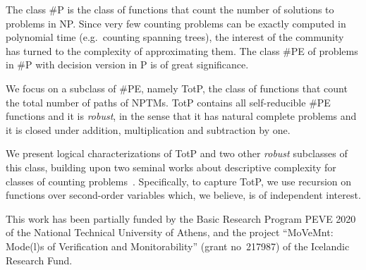 \documentclass[bsl,meeting]{asl}
\def\urladdr#1{\endgraf\noindent{\it URL Address}: {\tt #1}.}
\newcommand{\NP}{}
\begin{document}
\thispagestyle{empty}




{}
%
%
%

The class \textsf{\#P} is the class of functions that count the number of solutions to problems in \textsf{NP}.
Since very few counting problems can be exactly computed in polynomial time (e.g.\ counting spanning trees), the interest of the community has  turned to the complexity of approximating them.
The class \textsf{\#PE} of problems in \textsf{\#P} with decision version in \textsf{P} is of great significance.

We focus on a subclass of \textsf{\#PE}, namely \textsf{TotP}, %
the class of functions that count the total number of paths of NPTMs. 
\textsf{TotP}
contains all self-reducible \textsf{\#PE} functions and it is \emph{robust}, in the sense that it has natural complete problems and it is closed under addition, multiplication and subtraction by one.

We present logical characterizations of \textsf{TotP} and two other \emph{robust} subclasses of this class, building upon two seminal works about descriptive complexity for classes of counting problems~\cite{Saluja,Arenas}. Specifically, to capture \textsf{TotP}, we use recursion on functions over second-order variables which, we believe,  is of independent interest.

This work has been partially funded by the Basic Research Program PEVE 2020 of the National Technical  University of Athens, and the project ``MoVeMnt: Mode(l)s of Verification and Monitorability'' (grant no~217987) of the Icelandic Research Fund.
\end{document}
